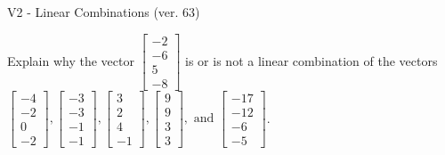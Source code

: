 \begin{exercise}
  \begin{exerciseTitle}V2 - Linear Combinations (ver. 63)\end{exerciseTitle}
  \begin{exerciseStatement}
    Explain why the vector \(\left[\begin{array}{c}
-2 \\
-6 \\
5 \\
-8
\end{array}\right]\)  is or is not a linear 
	combination of the vectors \(\left[\begin{array}{c}
-4 \\
-2 \\
0 \\
-2
\end{array}\right] , \left[\begin{array}{c}
-3 \\
-3 \\
-1 \\
-1
\end{array}\right] , \left[\begin{array}{c}
3 \\
2 \\
4 \\
-1
\end{array}\right] , \left[\begin{array}{c}
9 \\
9 \\
3 \\
3
\end{array}\right] , \text{ and } \left[\begin{array}{c}
-17 \\
-12 \\
-6 \\
-5
\end{array}\right]\).
	



\end{exerciseStatement}
\end{exercise}
